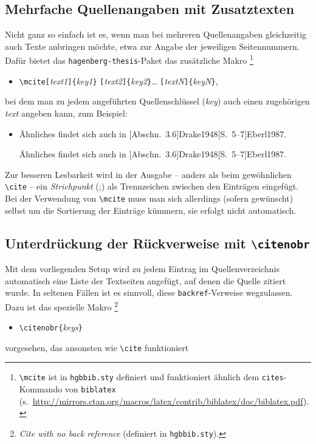 \subsection{Mehrfache Quellenangaben mit Zusatztexten}

Nicht ganz so einfach ist es, wenn man bei mehreren Quellenangaben
gleichzeitig auch Texte anbringen möchte, etwa zur Angabe der jeweiligen
Seitennummern. Dafür bietet das \texttt{hagenberg-thesis}-Paket das
zusätzliche Makro%
\footnote{\texttt{\textbackslash mcite} ist in \texttt{hgbbib.sty} definiert und
funktioniert ähnlich dem \texttt{{\bs}cites}-Kommando von \texttt{biblatex}
(s.\ \url{http://mirrors.ctan.org/macros/latex/contrib/biblatex/doc/biblatex.pdf}).}
%
\begin{itemize}
\item[]
\verb!\mcite[!\textit{text1}\verb!]{!\textit{key1}\verb!}!%
      \verb![!\textit{text2}\verb!]{!\textit{key2}\verb!}!\ldots%
			\verb![!\textit{textN}\verb!]{!\textit{keyN}\verb!}!,
\end{itemize}
%
bei dem man zu jedem angeführten Quellenschlüssel (\textit{key}) auch einen
zugehörigen \textit{text} angeben kann, zum Beispiel:
%
\begin{itemize}
    \item Ähnliches findet sich auch in
    [Abschn.~3.6]{Drake1948}[S.~5--7]{Eberl1987}.
\begin{LaTeXCode}[numbers=none]
Ähnliches findet sich auch in [Abschn.~3.6]{Drake1948}[S.~5--7]{Eberl1987}.
\end{LaTeXCode}
\end{itemize}
%
Zur besseren Lesbarkeit wird in der Ausgabe -- anders als beim gewöhnlichen
\texttt{\textbackslash cite} -- ein \emph{Strichpunkt} (;) als Trennzeichen
zwischen den Einträgen eingefügt. Bei der Verwendung von
\texttt{\textbackslash mcite} muss man sich allerdings (sofern gewünscht)
selbst um die Sortierung der Einträge kümmern, sie erfolgt nicht automatisch.


\subsection{Unterdrückung der Rückverweise mit \texttt{\textbackslash citenobr}}

Mit dem vorliegenden Setup wird zu jedem Eintrag im Quellenverzeichnis
automatisch eine Liste der Textseiten angefügt, auf denen die Quelle zitiert
wurde. In seltenen Fällen ist es sinnvoll, diese \texttt{backref}-Verweise
wegzulassen. Dazu ist das spezielle Makro%
\footnote{\emph{Cite with no back reference} (definiert in \texttt{hgbbib.sty}).}
%
\begin{itemize}
    \item[] \verb!\citenobr{!\textit{keys}\verb!}!
\end{itemize}
vorgesehen, das ansonsten wie \texttt{\textbackslash cite} funktioniert
%

